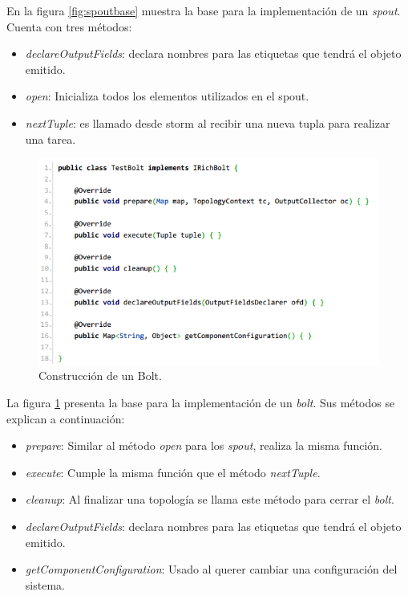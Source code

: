 En la figura \ref{fig:spoutbase} muestra la base para la implementación de un \textit{spout}. Cuenta con tres métodos:

\begin{itemize}
\item \textit{declareOutputFields}: declara nombres para las etiquetas que tendrá el objeto emitido.
\item \textit{open}: Inicializa todos los elementos utilizados en el spout.
\item \textit{nextTuple}: es llamado desde storm al recibir una nueva tupla para realizar una tarea.
\end{itemize}	

\begin{figure}[H]
	\centering
	\captionsetup{justification=centering}
	\includegraphics[scale=0.8]{images/BoltBase.png}
	\caption[Construcción de un Bolt.]{Construcción de un Bolt.}
	\label{fig:boltbase}
\end{figure}

La figura \ref{fig:boltbase} presenta la base para la implementación de un \textit{bolt}. Sus métodos se explican a continuación:

\begin{itemize}
\item \textit{prepare}: Similar al método \textit{open} para los \textit{spout}, realiza la misma función.
\item \textit{execute}: Cumple la misma función que el método \textit{nextTuple}.
\item \textit{cleanup}: Al finalizar una topología se llama este método para cerrar el \textit{bolt}.
\item \textit{declareOutputFields}: declara nombres para las etiquetas que tendrá el objeto emitido.
\item \textit{getComponentConfiguration}: Usado al querer cambiar una configuración del sistema.
\end{itemize}

